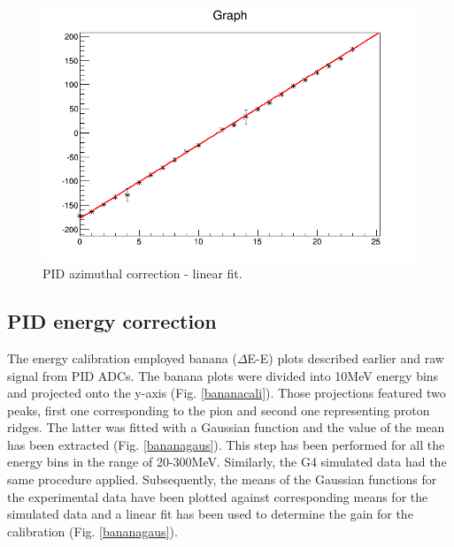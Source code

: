 \begin{figure}[H]
\begin{center}
\includegraphics[scale=0.4]{pictures/png/pidcali4.png}
\caption{PID azimuthal correction - linear fit.}
\label{pidphi2}
\end{center}
\end{figure}

\subsection{PID energy correction}

\indent The energy calibration employed banana ($\Delta$E-E) plots described earlier and raw signal from PID ADCs. The banana plots were divided into 10MeV energy bins and projected onto the y-axis (Fig. \ref{bananacali}). Those projections featured two peaks, first one corresponding to the pion and second one representing proton ridges. The latter was fitted with a Gaussian function and the value of the mean has been extracted (Fig. \ref{bananagaus}). This step has been performed for all the energy bins in the range of 20-300MeV. Similarly, the G4 simulated data had the same procedure applied. Subsequently, the means of the Gaussian functions for the experimental data have been plotted against corresponding means for the simulated data and a linear fit has been used to determine the gain for the calibration (Fig. \ref{bananagaus}).

